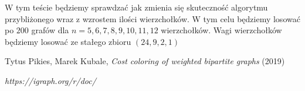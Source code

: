 \documentclass{article}
\begin{document}
W tym teście będziemy sprawdzać jak zmienia się skuteczność algorytmu przybliżonego wraz z wzrostem ilości wierzchołków. W tym celu będziemy losować po $200$ grafów dla $n = 5,6,7,8,9,10,11,12$ wierzchołków. Wagi wierzchołków będziemy losować ze stałego zbioru $(24, 9, 2, 1)$

\begin{thebibliography}{9}

Tytus Pikies, Marek Kubale,
\emph{Cost coloring of weighted bipartite graphs}
(2019)

\emph{https://igraph.org/r/doc/}

\end{thebibliography}
\end{document}
